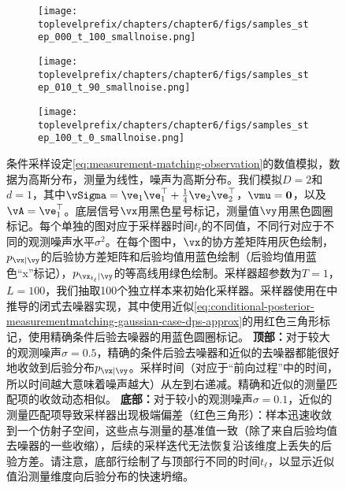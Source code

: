 \documentclass[../../book-main.tex]{subfiles}
\begin{document}
\begin{example}
\begin{figure}[tbp]
    \vspace{2mm} %

    \begin{subfigure}{0.32\textwidth}
      \texttt{[image: \\toplevelprefix/chapters/chapter6/figs/samples\_step\_000\_t\_100\_smallnoise.png]}
    \end{subfigure}
    \hfill
    \begin{subfigure}{0.32\textwidth}
      \texttt{[image: \\toplevelprefix/chapters/chapter6/figs/samples\_step\_010\_t\_90\_smallnoise.png]}
    \end{subfigure}
    \hfill
    \begin{subfigure}{0.32\textwidth}
      \texttt{[image: \\toplevelprefix/chapters/chapter6/figs/samples\_step\_100\_t\_0\_smallnoise.png]}
    \end{subfigure}

    \caption{条件采样设定\eqref{eq:measurement-matching-observation}的数值模拟，数据为高斯分布，测量为线性，噪声为高斯分布。我们模拟$D=2$和$d=1$，其中$\vSigma = \ve_1 \ve_1^\top + \tfrac{1}{4} \ve_2 \ve_2^\top$，$\vmu = \Zero$，以及$\vA = \ve_1^\top$。底层信号$\vx$用黑色星号标记，测量值$\vy$用黑色圆圈标记。每个单独的图对应于采样器时间$t_{\ell}$的不同值，不同行对应于不同的观测噪声水平$\sigma^2$。在每个图中，$\vx$的协方差矩阵用灰色绘制，$p_{\vx \mid \vy}$的后验协方差矩阵和后验均值用蓝色绘制（后验均值用蓝色“x”标记），$p_{\vx_{t_{\ell}} \mid \vy}$的等高线用绿色绘制。采样器超参数为$T=1$，$L=100$，我们抽取100个独立样本来初始化采样器。采样器使用在中推导的闭式去噪器实现，其中使用近似\eqref{eq:conditional-posterior-measurementmatching-gaussian-case-dps-approx}的用红色三角形标记，使用精确条件后验去噪器的用蓝色圆圈标记。
    \textbf{顶部：}对于较大的观测噪声$\sigma = 0.5$，精确的条件后验去噪器和近似的去噪器都能很好地收敛到后验分布$p_{\vx \mid \vy}$。采样时间（对应于“前向过程”中的时间，所以时间越大意味着噪声越大）从左到右递减。精确和近似的测量匹配项的收敛动态相似。
    \textbf{底部：}对于较小的观测噪声$\sigma = 0.1$，近似的测量匹配项导致采样器出现极端偏差（红色三角形）：样本迅速收敛到一个仿射子空间，这些点与测量的基准值一致（除了来自后验均值去噪器的一些收缩），后续的采样迭代无法恢复沿该维度上丢失的后验方差。请注意，底部行绘制了与顶部行不同的时间$t_{\ell}$，以显示近似值沿测量维度向后验分布的快速坍缩。}
    \label{fig:conditional_sampling_computational_gaussian}
  \end{figure}


\end{example}
\end{document}

